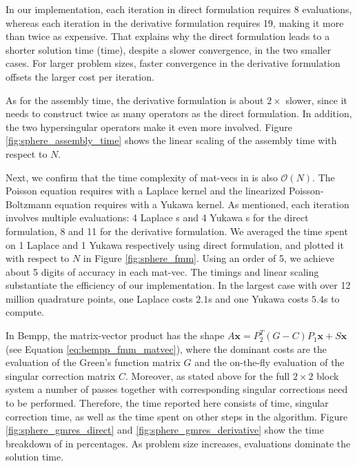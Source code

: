In our implementation, each iteration in direct formulation requires $8$ \fmm evaluations, whereas each iteration in the derivative formulation requires 19, making it more than twice as expensive.
That explains why the direct formulation leads to a shorter solution time (\gmres time), despite a slower convergence, in the two smaller cases.
For larger problem sizes, faster convergence in the derivative formulation offsets the larger cost per iteration.

As for the assembly time, the derivative formulation is about $2\times$ slower, since it needs to construct twice as many operators as the direct formulation.
In addition, the two hypersingular operators make it even more involved.
Figure \ref{fig:sphere_assembly_time} shows the linear scaling of the assembly time with respect to $N$.

Next, we confirm that the time complexity of mat-vecs in \gmres is also $\mathcal{O}(N)$.
The Poisson equation requires \fmm with a Laplace kernel and the linearized Poisson-Boltzmann equation requires \fmm with a Yukawa kernel.
As mentioned, each iteration involves multiple \fmm evaluations: 4 Laplace {\fmm}s and 4 Yukawa {\fmm}s for the direct formulation, 8 and 11 for the derivative formulation.
We averaged the time spent on 1 Laplace \fmm and 1 Yukawa \fmm respectively using direct formulation, and plotted it with respect to $N$ in Figure \ref{fig:sphere_fmm}.
Using an \fmm order of 5, we achieve about 5 digits of accuracy in each mat-vec.
The timings and linear scaling substantiate the efficiency of our \fmm implementation.
In the largest case with over 12 million quadrature points, one Laplace \fmm costs $2.1$s and one Yukawa \fmm costs $5.4$s to compute.

In Bempp, the matrix-vector product has the shape $A\mathbf{x} = P_2^T (G - C)P_1 \mathbf{x} + S \mathbf{x}$ (see Equation \ref{eq:bempp_fmm_matvec}), where the dominant costs are the \fmm evaluation of the Green's function matrix $G$ and the on-the-fly evaluation of the singular correction matrix $C$. Moreover, as stated above for the full $2\times 2$ block system a number of \fmm passes together with corresponding singular corrections need to be performed.
Therefore, the \gmres time reported here consists of \fmm time, singular correction time, as well as the time spent on other steps in the \gmres algorithm.
Figure \ref{fig:sphere_gmres_direct} and \ref{fig:sphere_gmres_derivative} show the time breakdown of \gmres in percentages.
As problem size increases, \fmm evaluations dominate the solution time.


